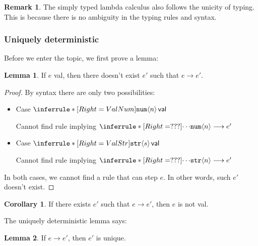 \documentclass{article}
\theoremstyle{definition}
\newtheorem{lemma}{Lemma}[section]
\newtheorem*{remark}{Remark}
\newtheorem{corollary}{Corollary}[section]
\newcommand{\ip}[1]{\langle #1 \rangle}
\begin{document}
\begin{remark}
    The simply typed lambda calculus also follows the unicity of typing. This is because there is no ambiguity in the typing rules and syntax.
\end{remark}

\subsubsection*{Uniquely deterministic}

Before we enter the topic, we first prove a lemma:

\begin{lemma}
    \label{lem:valorstep}
    If $e$ \textsf{val}, then there doesn't exist $e'$ such that $e\longrightarrow e'$.
\end{lemma}

\begin{proof}
    By syntax there are only two possibilities:
    \begin{itemize}
        \item Case $\inferrule*[Right=ValNum]{ }{\mathtt{num}\ip{n}\, \mathsf{val}}$

              Cannot find rule implying $\inferrule*[Right=???]{\cdots}{\mathtt{num}\ip{n}\longrightarrow e'}$

        \item Case $\inferrule*[Right=ValStr]{ }{\mathtt{str}\ip{s}\, \mathsf{val}}$

              Cannot find rule implying $\inferrule*[Right=???]{\cdots}{\mathtt{str}\ip{n}\longrightarrow e'}$

    \end{itemize}
    In both cases, we cannot find a rule that can step $e$.
    In other words, such $e'$ doesn't exist.
\end{proof}

\begin{corollary}
    \label{cor:uniquedet}
    If there exists $e'$ such that $e\longrightarrow e'$, then $e$ is not \textsf{val}.
\end{corollary}

The uniquely deterministic lemma says:
\begin{lemma}
    If $e\longrightarrow e'$, then $e'$ is unique.
\end{lemma}
\end{document}
